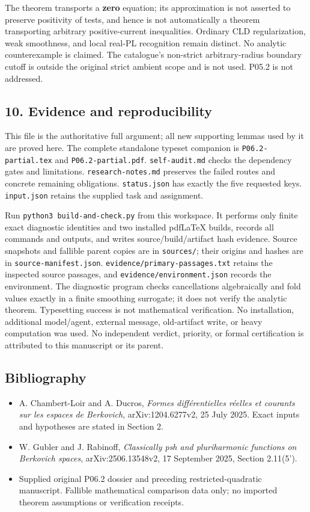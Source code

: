 \documentclass[
  11pt,
]{article}
\providecommand{\tightlist}{%
  \setlength{\itemsep}{0pt}\setlength{\parskip}{0pt}}
\begin{document}
The theorem transports a \textbf{zero} equation; its approximation is
not asserted to preserve positivity of tests, and hence is not
automatically a theorem transporting arbitrary positive-current
inequalities. Ordinary CLD regularization, weak smoothness, and local
real-PL recognition remain distinct. No analytic counterexample is
claimed. The catalogue's non-strict arbitrary-radius boundary cutoff is
outside the original strict ambient scope and is not used. P05.2 is not
addressed.

\subsection{10. Evidence and
reproducibility}\label{evidence-and-reproducibility}

This file is the authoritative full argument; all new supporting lemmas
used by it are proved here. The complete standalone typeset companion is
\texttt{P06.2-partial.tex} and \texttt{P06.2-partial.pdf}.
\texttt{self-audit.md} checks the dependency gates and limitations.
\texttt{research-notes.md} preserves the failed routes and concrete
remaining obligations. \texttt{status.json} has exactly the five
requested keys. \texttt{input.json} retains the supplied task and
assignment.

Run \texttt{python3\ build-and-check.py} from this workspace. It
performs only finite exact diagnostic identities and two installed
pdfLaTeX builds, records all commands and outputs, and writes
source/build/artifact hash evidence. Source snapshots and fallible
parent copies are in \texttt{sources/}; their origins and hashes are in
\texttt{source-manifest.json}. \texttt{evidence/primary-passages.txt}
retains the inspected source passages, and
\texttt{evidence/environment.json} records the environment. The
diagnostic program checks cancellations algebraically and fold values
exactly in a finite smoothing surrogate; it does not verify the analytic
theorem. Typesetting success is not mathematical verification. No
installation, additional model/agent, external message, old-artifact
write, or heavy computation was used. No independent verdict, priority,
or formal certification is attributed to this manuscript or its parent.

\subsection{Bibliography}\label{bibliography}

\begin{itemize}
\tightlist
\item
  A. Chambert-Loir and A. Ducros, \emph{Formes différentielles réelles
  et courants sur les espaces de Berkovich}, arXiv:1204.6277v2, 25 July
  2025. Exact inputs and hypotheses are stated in Section 2.
\item
  W. Gubler and J. Rabinoff, \emph{Classically psh and pluriharmonic
  functions on Berkovich spaces}, arXiv:2506.13548v2, 17 September 2025,
  Section 2.11(5').
\item
  Supplied original P06.2 dossier and preceding restricted-quadratic
  manuscript. Fallible mathematical comparison data only; no imported
  theorem assumptions or verification receipts.
\end{itemize}
\end{document}
